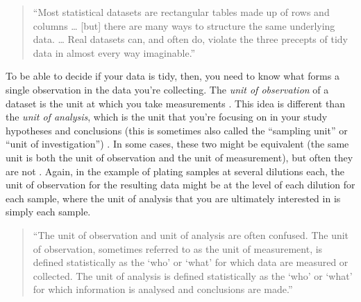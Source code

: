 \documentclass[]{tufte-book}
\begin{document}
\begin{quote}
``Most statistical datasets are rectangular tables made up of rows and columns
\ldots{} {[}but{]} there are many ways to structure the same underlying data. \ldots{}
Real datasets can, and often do, violate the three precepts of tidy data in
almost every way imaginable.'' \citep{wickham2014tidy}
\end{quote}

To be able to decide if your data is tidy, then, you need to know what forms a
single observation in the data you're collecting. The \emph{unit of observation} of a
dataset is the unit at which you take measurements \citep{sedgwick2014unit}. This
idea is different than the \emph{unit of analysis}, which is the unit that you're
focusing on in your study hypotheses and conclusions (this is sometimes also
called the ``sampling unit'' or ``unit of investigation'') \citep{altman1997units}. In
some cases, these two might be equivalent (the same unit is both the unit of
observation and the unit of measurement), but often they are not \citep{sedgwick2014unit}. Again, in the example of plating samples at several
dilutions each, the unit of observation for the resulting data might be
at the level of each dilution for each sample, where the unit of analysis
that you are ultimately interested in is simply each sample.

\begin{quote}
``The unit of observation and unit of analysis are often confused.
The unit of observation, sometimes referred to as the unit of
measurement, is defined statistically as the `who' or `what'
for which data are measured or collected. The unit of analysis
is defined statistically as the `who' or `what' for which
information is analysed and conclusions are made.'' \citep{sedgwick2014unit}
\end{quote}
\end{document}

